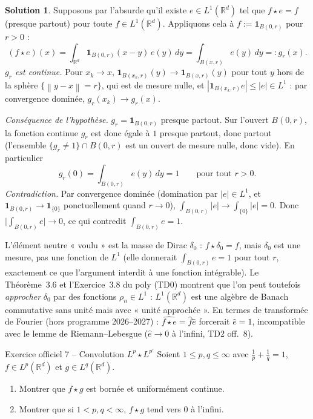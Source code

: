 \documentclass[11pt,a4paper]{article}
\newcommand{\R}{\mathbb{R}}
\newcommand{\norm}[1]{\left\|#1\right\|}
\theoremstyle{definition}
\newtheorem*{solution}{Solution}
\begin{document}
\begin{solution}
Supposons par l'absurde qu'il existe $e\in L^1(\R^d)$ tel que $f\star e=f$ (presque partout) pour toute $f\in L^1(\R^d)$. Appliquons cela à $f:=\mathbf 1_{B(0,r)}$ pour $r>0$ :
\[
(f\star e)(x)=\int_{\R^d}\mathbf 1_{B(0,r)}(x-y)\,e(y)\,dy=\int_{B(x,r)}e(y)\,dy=:g_r(x).
\]
\emph{$g_r$ est continue.} Pour $x_k\to x$, $\mathbf 1_{B(x_k,r)}(y)\to\mathbf 1_{B(x,r)}(y)$ pour tout $y$ hors de la sphère $\{\norm{y-x}=r\}$, qui est de mesure nulle, et $|\mathbf 1_{B(x_k,r)}e|\le|e|\in L^1$ : par convergence dominée, $g_r(x_k)\to g_r(x)$.

\emph{Conséquence de l'hypothèse.} $g_r=\mathbf 1_{B(0,r)}$ presque partout. Sur l'ouvert $B(0,r)$, la fonction continue $g_r$ est donc égale à $1$ presque partout, donc partout (l'ensemble $\{g_r\ne1\}\cap B(0,r)$ est un ouvert de mesure nulle, donc vide). En particulier
\[
g_r(0)=\int_{B(0,r)}e(y)\,dy=1\qquad\text{pour tout }r>0 .
\]
\emph{Contradiction.} Par convergence dominée (domination par $|e|\in L^1$, et $\mathbf 1_{B(0,r)}\to\mathbf 1_{\{0\}}$ ponctuellement quand $r\to0$), $\int_{B(0,r)}|e|\to\int_{\{0\}}|e|=0$. Donc $\big|\int_{B(0,r)}e\big|\to0$, ce qui contredit $\int_{B(0,r)}e=1$.
\end{solution}

\begin{commentaire}
L'élément neutre « voulu » est la masse de Dirac $\delta_0$ : $f\star\delta_0=f$, mais $\delta_0$ est une mesure, pas une fonction de $L^1$ (elle donnerait $\int_{B(0,r)}e=1$ pour tout $r$, exactement ce que l'argument interdit à une fonction intégrable). Le Théorème~3.6 et l'Exercice~3.8 du poly (TD0) montrent que l'on peut toutefois \emph{approcher} $\delta_0$ par des fonctions $\rho_n\in L^1$ : $L^1(\R^d)$ est une algèbre de Banach commutative sans unité mais avec « unité approchée ». En termes de transformée de Fourier (hors programme 2026--2027) : $\widehat{f\star e}=\hat f\hat e$ forcerait $\hat e=1$, incompatible avec le lemme de Riemann--Lebesgue ($\hat e\to0$ à l'infini, TD2 off.~8).
\end{commentaire}

\begin{exo}{Exercice officiel 7 -- Convolution $L^p\star L^{p'}$}
Soient $1\le p,q\le\infty$ avec $\frac1p+\frac1q=1$, $f\in L^p(\R^d)$ et $g\in L^q(\R^d)$.
\begin{enumerate}[label=(\alph*)]
  \item Montrer que $f\star g$ est bornée et uniformément continue.
  \item Montrer que si $1<p,q<\infty$, $f\star g$ tend vers $0$ à l'infini.
\end{enumerate}
\end{exo}
\end{document}
